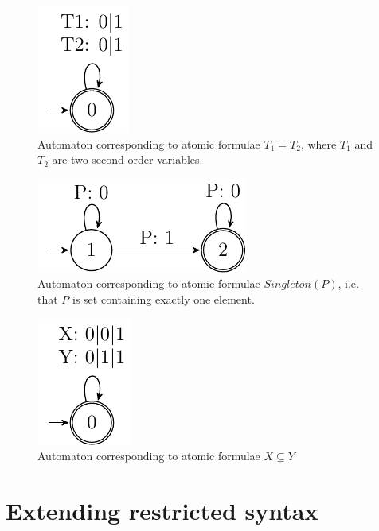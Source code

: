 \begin{figure}[h!]
 \begin{center}
  \includegraphics{fig/atomic-equal-terms}
 \end{center}
 \caption{Automaton corresponding to atomic formulae $T_1 = T_2$, where $T_1$
 and $T_2$ are two second-order variables.}
\end{figure}

\begin{figure}[h!]
 \begin{center}
  \includegraphics{fig/atomic-singleton}
 \end{center}
 \caption{Automaton corresponding to atomic formulae $\mathit{Singleton}(P)$,
 i.e. that $P$ is set containing exactly one element.}
\end{figure}

\begin{figure}[h!]
 \begin{center}
  \includegraphics{fig/atomic-subset}
 \end{center}
 \caption{Automaton corresponding to atomic formulae $X \subseteq Y$}
\end{figure}

\section{Extending restricted syntax}

